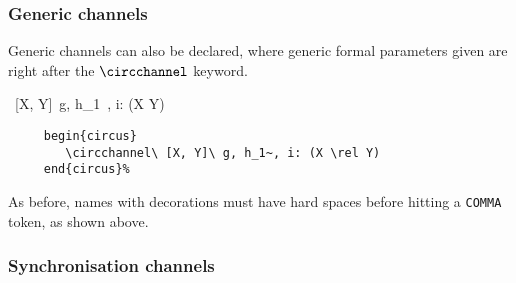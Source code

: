 \documentclass{article}
\begin{document}
\subsubsection{Generic channels}

Generic channels can also be declared, where generic formal parameters given
are right after the $\circchannel$ keyword.
%
\begin{circus}
   \circchannel\ [X, Y]\ g, h_1~, i: (X \rel Y)
\end{circus}%
%
\begin{verbatim}
     begin{circus}
        \circchannel\ [X, Y]\ g, h_1~, i: (X \rel Y)
     end{circus}%
\end{verbatim}
%
As before, names with decorations must have hard spaces before hitting a
\texttt{COMMA} token, as shown above.

%
%
%
%
%
%
%
%
%

\subsubsection{Synchronisation channels}
\end{document}
